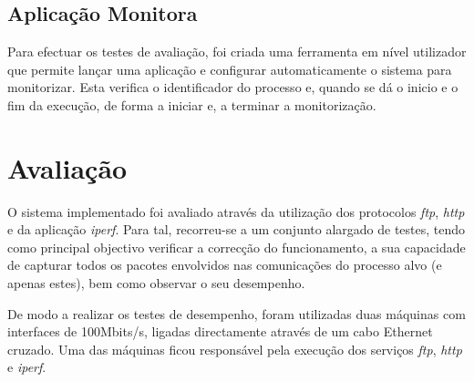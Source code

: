\documentclass[a4paper]{llncs}
\begin{document}
\subsection{Aplicação Monitora}
\label{sub:monitor_app}

Para efectuar os testes de avaliação, foi criada uma ferramenta em nível utilizador que permite lançar uma aplicação e configurar automaticamente o sistema para monitorizar.
 Esta verifica o identificador do processo e, quando se dá o inicio e o fim da execução, de forma a iniciar e, a terminar a monitorização.



\section{Avaliação}
\label{sec:evaluation}

O sistema implementado foi avaliado através da utilização dos protocolos \textit{ftp}, \textit{http} e da aplicação \textit{iperf}.
 Para tal, recorreu-se a um conjunto alargado de testes, tendo como principal objectivo verificar a correcção do funcionamento, a sua capacidade de capturar todos os pacotes envolvidos nas comunicações do processo alvo (e apenas estes), bem como observar o seu desempenho.


De modo a realizar os testes de desempenho, foram utilizadas duas máquinas com interfaces de 100Mbits/s, ligadas directamente através de um cabo Ethernet cruzado. Uma das máquinas ficou responsável pela execução dos serviços \textit{ftp}, \textit{http} e \textit{iperf}.
\end{document}
